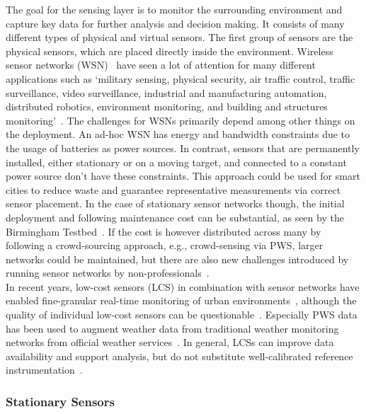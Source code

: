 The goal for the sensing layer is to monitor the surrounding environment and capture key data for further analysis and decision making. It consists of many different types of physical and virtual sensors. The first group of sensors are the physical sensors, which are placed directly inside the environment. Wireless sensor networks (WSN)~\cite{dargie2010fundamentals} have seen a lot of attention for many different applications such as `military sensing, physical security, air traffic control, traffic surveillance, video surveillance, industrial and manufacturing automation, distributed robotics, environment monitoring, and building and structures monitoring'~\cite{chong2003sensor}. The challenges for WSNs primarily depend among other things on the deployment. An ad-hoc WSN has energy and bandwidth constraints due to the usage of batteries as power sources.
In contrast, sensors that are permanently installed, either stationary or on a moving target, and connected to a constant power source don't have these constraints. This approach could be used for smart cities to reduce waste and guarantee representative measurements via correct sensor placement. In the case of stationary sensor networks though, the initial deployment and following maintenance cost can be substantial, as seen by the Birmingham Testbed~\cite{chapman2015birmingham}. If the cost is however distributed across many by following a crowd-sourcing approach, e.g., crowd-sensing via PWS, larger networks could be maintained, but there are also new challenges introduced by running sensor networks by non-professionals~\cite{meier2017crowdsourcing}.\\
In recent years, low-cost sensors (LCS) in combination with sensor networks have enabled fine-granular real-time monitoring of urban environments~\cite{grimmond2006progress, rundel2009environmental}, although the quality of individual low-cost sensors can be questionable~\cite{castell2017can}. Especially PWS data has been used to augment weather data from traditional weather monitoring networks from official weather services~\cite{hahn2022observations}. In general, LCSs can improve data availability and support analysis, but do not substitute well-calibrated reference instrumentation~\cite{lewis2018low}.

\subsubsection{Stationary Sensors}

